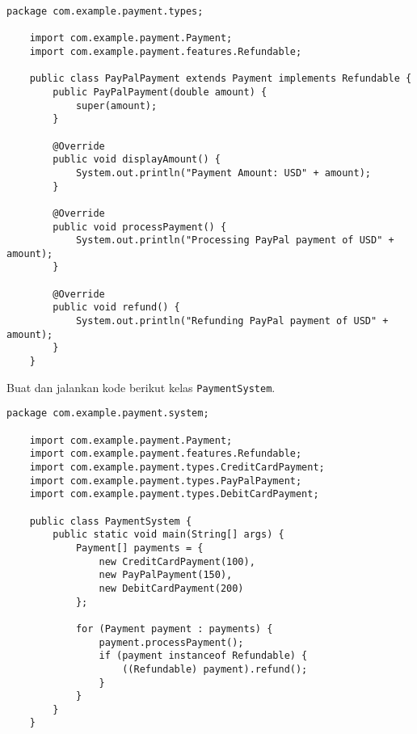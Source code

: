 \begin{lstlisting}[style=JavaStyle, caption={PayPalPayment.java}]
	package com.example.payment.types;
	
	import com.example.payment.Payment;
	import com.example.payment.features.Refundable;
	
	public class PayPalPayment extends Payment implements Refundable {
		public PayPalPayment(double amount) {
			super(amount);
		}
		
		@Override
		public void displayAmount() {
			System.out.println("Payment Amount: USD" + amount);
		}
		
		@Override
		public void processPayment() {
			System.out.println("Processing PayPal payment of USD" + amount);
		}
		
		@Override
		public void refund() {
			System.out.println("Refunding PayPal payment of USD" + amount);
		}
	}
\end{lstlisting}

Buat dan jalankan kode berikut kelas \texttt{PaymentSystem}. 

\begin{lstlisting}[style=JavaStyle, caption={PaymentSystem.java}]
	package com.example.payment.system;
	
	import com.example.payment.Payment;
	import com.example.payment.features.Refundable;
	import com.example.payment.types.CreditCardPayment;
	import com.example.payment.types.PayPalPayment;
	import com.example.payment.types.DebitCardPayment;
	
	public class PaymentSystem {
		public static void main(String[] args) {
			Payment[] payments = {
				new CreditCardPayment(100),
				new PayPalPayment(150),
				new DebitCardPayment(200)
			};
			
			for (Payment payment : payments) {
				payment.processPayment();
				if (payment instanceof Refundable) {
					((Refundable) payment).refund();
				}
			}
		}
	}
\end{lstlisting}


